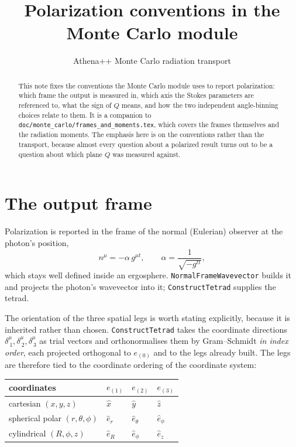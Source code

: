 \documentclass[11pt]{article}
\title{Polarization conventions in the Monte Carlo module}
\author{Athena++ Monte Carlo radiation transport}
\date{}
\begin{document}
\maketitle

\begin{abstract}
This note fixes the conventions the Monte Carlo module uses to report polarization: which
frame the output is measured in, which axis the Stokes parameters are referenced to, what
the sign of $Q$ means, and how the two independent angle-binning choices relate to them.
It is a companion to \texttt{doc/monte\_carlo/frames\_and\_moments.tex}, which covers the
frames themselves and the radiation moments. The emphasis here is on the conventions rather
than the transport, because almost every question about a polarized result turns out to be
a question about which plane $Q$ was measured against.
\end{abstract}

\section{The output frame}

Polarization is reported in the frame of the normal (Eulerian) observer at the photon's
position,
\begin{equation}
  n^\mu = -\alpha \, g^{\mu t} , \qquad \alpha = \frac{1}{\sqrt{-g^{tt}}} ,
\end{equation}
which stays well defined inside an ergosphere. \texttt{NormalFrameWavevector} builds it and
projects the photon's wavevector into it; \texttt{ConstructTetrad} supplies the tetrad.

The orientation of the three spatial legs is worth stating explicitly, because it is
inherited rather than chosen. \texttt{ConstructTetrad} takes the coordinate directions
$\delta^\mu_{\ 1}, \delta^\mu_{\ 2}, \delta^\mu_{\ 3}$ as trial vectors and orthonormalises
them by Gram--Schmidt \emph{in index order}, each projected orthogonal to $e_{(0)}$ and to
the legs already built. The legs are therefore tied to the coordinate ordering of the coordinate system:

\begin{table}[h]
\centering
\begin{tabular}{llll}
\toprule
coordinates & $e_{(1)}$ & $e_{(2)}$ & $e_{(3)}$ \\
\midrule
cartesian $(x,y,z)$          & $\hat{x}$   & $\hat{y}$      & $\hat{z}$ \\
spherical polar $(r,\theta,\phi)$ & $\hat{e}_r$ & $\hat{e}_\theta$ & $\hat{e}_\phi$ \\
cylindrical $(R,\phi,z)$     & $\hat{e}_R$ & $\hat{e}_\phi$ & $\hat{e}_z$ \\
\bottomrule
\end{tabular}
\end{table}
\end{document}
